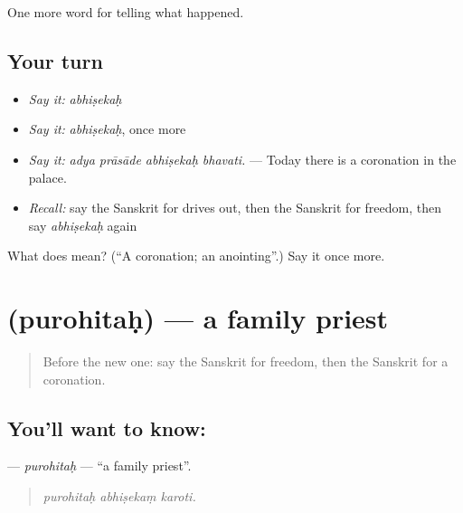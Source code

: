 \begin{grammarlens}[title={What you've built}]
One more word for telling what happened.
\end{grammarlens}

\subsection*{Your turn}
\begin{itemize}
\raggedright
  \item \emph{Say it:} \emph{abhiṣekaḥ}
  \item \emph{Say it:} \emph{abhiṣekaḥ}, once more
  \item \emph{Say it:} \emph{adya prāsāde abhiṣekaḥ bhavati.} — Today there is a coronation in the palace.
  \item \emph{Recall:} say the Sanskrit for drives out, then the Sanskrit for freedom, then say \emph{abhiṣekaḥ} again
\end{itemize}

\begin{tcolorbox}[breakable,colback=teal!4,colframe=teal!35!black,title={Before you move on}]
What does  mean? (\textquotedblleft{}A coronation; an anointing\textquotedblright{}.) Say it once more.
\end{tcolorbox}
\section[\texorpdfstring{\sk{पुरोहितः} (purohitaḥ)}{पुरोहितः (purohitaḥ)}]{ (purohitaḥ) — a family priest}

\label{lesson:SA-C321-purohitah}



\begin{quote}
Before the new one: say the Sanskrit for freedom, then the Sanskrit for a coronation.
\end{quote}

\subsection*{You'll want to know: }
\textbf{} — \emph{purohitaḥ} — \textquotedblleft{}a family priest\textquotedblright{}.

\begin{quote}
  
\end{quote}

\begin{quote}
\emph{purohitaḥ abhiṣekaṃ karoti.}
\end{quote}

